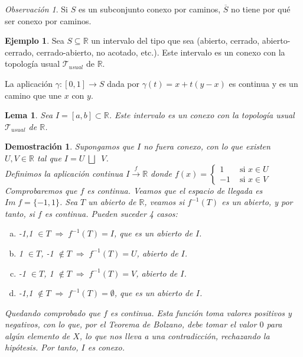 \documentclass[12pt,twoside]{report}
\newcommand\mc[1]{\mathcal{#1}}
\theoremstyle{azul}
\newtheorem*{demx}{Demostración}
\newtheorem*{lemx}{Lema}
\theoremstyle{azul2}
\theoremstyle{plain}
\theoremstyle{definition}
\newtheorem*{eje}{Ejemplo}
\theoremstyle{remark}
\newtheorem*{obs}{Observación}
\begin{document}
\begin{obs}
Si $S$ es un subconjunto conexo por caminos, $\overline{S}$ no tiene por qu{\'e} ser conexo por caminos.
\end{obs}
\begin{eje}
Sea $S \subseteq \mathbb{R}$ un intervalo del tipo que sea (abierto, cerrado, abierto-cerrado, cerrado-abierto, no acotado, etc.). Este intervalo es un conexo con la topología usual $\mc{T} _{usual}$ de $\mathbb{R}$.

La aplicación $\gamma: [0,1] \longrightarrow S$ dada por $\gamma(t)=x+t(y-x)$ es continua y es un camino que une $x$ con $y$.
\end{eje}
\begin{lemx}
Sea $I=[a,b] \subset \mathbb{R}$. Este intervalo es un conexo con la topología usual $\mc{T} _{usual}$ de $\mathbb{R}$.
\end{lemx}
\begin{demx}
Supongamos que $I$ no fuera conexo, con lo que existen $U, V \in \mathbb{R}$ tal que $I=U \; {\bigsqcup \;} \; V$.\\
Definimos la aplicación continua $I \stackrel{f}{\longrightarrow} \mathbb{R}$ donde $f(x)=\left\{ \begin{array}{rl}
         1 & \text{ si } x \in U \\
         -1 & \text{ si } x \in V 
    \end{array} \right.$  \\\vspace{5mm} 
Comprobaremos que $f$ es continua. Veamos que el espacio de llegada es \\ $Im \; f=\{-1,1\}$. Sea $T$ un abierto de $\mathbb{R}$, veamos si $f^{-1}(T)$ es un abierto, y por tanto, si $f$ es continua. Pueden suceder 4 casos:
\begin{enumerate}[a)]
    \item -1,1 $\in T \; \Rightarrow \; f^{-1}(T)=I$, que es un abierto de $I$.
    \item 1 $\in T$, -1 $\nin T \; \Rightarrow \; f^{-1}(T)=U$, abierto de $I$. 
    \item -1 $\in T$, 1 $\nin T \; \Rightarrow \; f^{-1}(T)=V$, abierto de $I$. 
    \item -1,1 $\nin T \; \Rightarrow \; f^{-1}(T)=\emptyset$, que es un abierto de $I$.
\end{enumerate}
Quedando comprobado que $f$ es continua. Esta función toma valores positivos y negativos, con lo que, por el Teorema de Bolzano, debe tomar el valor $0$ para algún elemento de $X$, lo que nos lleva a una contradicción, rechazando la hipótesis. Por tanto, $I$ es conexo.
\end{demx}
\end{document}
